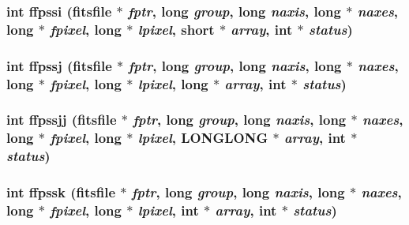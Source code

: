 \subsubsection{\setlength{\rightskip}{0pt plus 5cm}int ffpssi (\bf{fitsfile} $\ast$ {\em fptr}, long {\em group}, long {\em naxis}, long $\ast$ {\em naxes}, long $\ast$ {\em fpixel}, long $\ast$ {\em lpixel}, short $\ast$ {\em array}, int $\ast$ {\em status})}\label{src_2fitsio_8h_2cf8bd9e8aec6e36d824b4fd9b34b9e0}


\subsubsection{\setlength{\rightskip}{0pt plus 5cm}int ffpssj (\bf{fitsfile} $\ast$ {\em fptr}, long {\em group}, long {\em naxis}, long $\ast$ {\em naxes}, long $\ast$ {\em fpixel}, long $\ast$ {\em lpixel}, long $\ast$ {\em array}, int $\ast$ {\em status})}\label{src_2fitsio_8h_ed68d2a2c51c19b9579ca7db53e148c5}


\subsubsection{\setlength{\rightskip}{0pt plus 5cm}int ffpssjj (\bf{fitsfile} $\ast$ {\em fptr}, long {\em group}, long {\em naxis}, long $\ast$ {\em naxes}, long $\ast$ {\em fpixel}, long $\ast$ {\em lpixel}, \bf{LONGLONG} $\ast$ {\em array}, int $\ast$ {\em status})}\label{src_2fitsio_8h_f77af8b17c852fc01b279669bc4d1331}


\subsubsection{\setlength{\rightskip}{0pt plus 5cm}int ffpssk (\bf{fitsfile} $\ast$ {\em fptr}, long {\em group}, long {\em naxis}, long $\ast$ {\em naxes}, long $\ast$ {\em fpixel}, long $\ast$ {\em lpixel}, int $\ast$ {\em array}, int $\ast$ {\em status})}\label{src_2fitsio_8h_07580d14729935ae3509602b651e7449}


